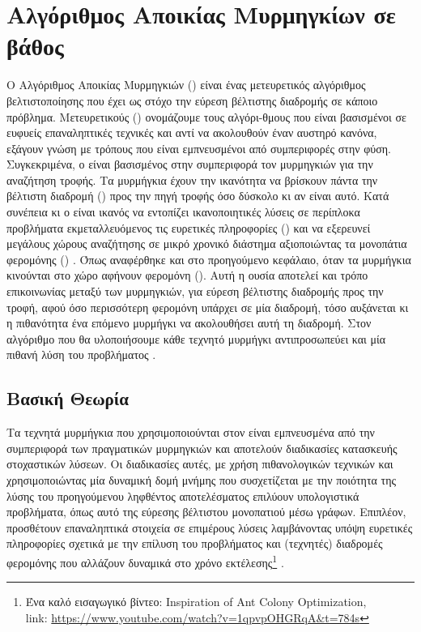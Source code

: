 \section{Αλγόριθμος Αποικίας Μυρμηγκίων σε βάθος}
Ο Αλγόριθμος Αποικίας Μυρμηγκιών () είναι ένας μετευρετικός αλγόριθμος βελτιστοποίησης που έχει ως στόχο την εύρεση βέλτιστης διαδρομής σε κάποιο πρόβλημα. Μετευρετικούς () ονομάζουμε τους αλγόρι-θμους που είναι βασισμένοι σε ευφυείς επαναληπτικές τεχνικές και αντί να ακολουθούν έναν αυστηρό κανόνα, εξάγουν γνώση με τρόπους που είναι εμπνευσμένοι από συμπεριφορές στην φύση. Συγκεκριμένα, ο  είναι βασισμένος στην συμπεριφορά τον μυρμηγκιών για την αναζήτηση τροφής. 
Τα μυρμήγκια έχουν την ικανότητα να βρίσκουν πάντα την βέλτιστη διαδρομή () προς την πηγή τροφής όσο δύσκολο κι αν είναι αυτό. Κατά συνέπεια κι ο  είναι ικανός να εντοπίζει ικανοποιητικές λύσεις σε περίπλοκα προβλήματα εκμεταλλευόμενος τις ευρετικές πληροφορίες () και να εξερευνεί μεγάλους χώρους αναζήτησης σε μικρό χρονικό διάστημα αξιοποιώντας τα μονοπάτια φερομόνης () \cite{mavrovouniotis2017survey}. Όπως αναφέρθηκε και στο προηγούμενο κεφάλαιο, όταν τα μυρμήγκια κινούνται στο χώρο αφήνουν φερομόνη (). Αυτή η ουσία αποτελεί και τρόπο επικοινωνίας μεταξύ των μυρμηγκιών, για εύρεση βέλτιστης διαδρομής προς την τροφή, αφού όσο περισσότερη φερομόνη υπάρχει σε μία διαδρομή, τόσο αυξάνεται κι η πιθανότητα ένα επόμενο μυρμήγκι να ακολουθήσει αυτή τη διαδρομή. Στον αλγόριθμο που θα υλοποιήσουμε κάθε τεχνητό μυρμήγκι αντιπροσωπεύει και μία πιθανή λύση του προβλήματος \cite{mavrovouniotis2017survey}. 


\subsection{Βασική Θεωρία}
Τα τεχνητά μυρμήγκια που χρησιμοποιούνται στον  είναι εμπνευσμένα από την συμπεριφορά των πραγματικών μυρμηγκιών και αποτελούν διαδικασίες κατασκευής στοχαστικών λύσεων. Οι διαδικασίες αυτές, με χρήση πιθανολογικών τεχνικών και χρησιμοποιώντας μία δυναμική δομή μνήμης που συσχετίζεται με την ποιότητα της λύσης του προηγούμενου ληφθέντος αποτελέσματος επιλύουν υπολογιστικά προβλήματα, όπως αυτό της εύρεσης βέλτιστου μονοπατιού μέσω γράφων. Επιπλέον, προσθέτουν επαναληπτικά στοιχεία σε επιμέρους λύσεις λαμβάνοντας υπόψη ευρετικές πληροφορίες σχετικά με την επίλυση του προβλήματος και (τεχνητές) διαδρομές φερομόνης που αλλάζουν δυναμικά στο χρόνο εκτέλεσης\footnote{Ένα καλό εισαγωγικό βίντεο: Inspiration of Ant Colony Optimization,\\ link: \url{https://www.youtube.com/watch?v=1qpvpOHGRqA&t=784s}} \cite{dorigo2003ant, mavrovouniotis2017survey}.

